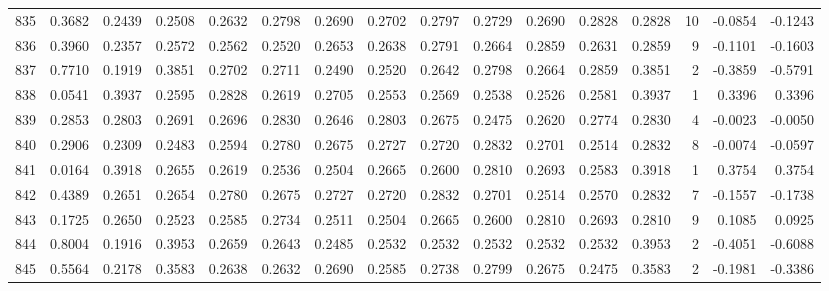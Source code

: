 \begin{tabular}{lrrrrrrrrrrrrrrr}
835 &      0.3682 &  0.2439 &  0.2508 &  0.2632 &  0.2798 &  0.2690 &  0.2702 &  0.2797 &  0.2729 &  0.2690 &   0.2828 &     0.2828 &     10 &                   -0.0854 &                    -0.1243 \\
836 &      0.3960 &  0.2357 &  0.2572 &  0.2562 &  0.2520 &  0.2653 &  0.2638 &  0.2791 &  0.2664 &  0.2859 &   0.2631 &     0.2859 &      9 &                   -0.1101 &                    -0.1603 \\
837 &      0.7710 &  0.1919 &  0.3851 &  0.2702 &  0.2711 &  0.2490 &  0.2520 &  0.2642 &  0.2798 &  0.2664 &   0.2859 &     0.3851 &      2 &                   -0.3859 &                    -0.5791 \\
838 &      0.0541 &  0.3937 &  0.2595 &  0.2828 &  0.2619 &  0.2705 &  0.2553 &  0.2569 &  0.2538 &  0.2526 &   0.2581 &     0.3937 &      1 &                    0.3396 &                     0.3396 \\
839 &      0.2853 &  0.2803 &  0.2691 &  0.2696 &  0.2830 &  0.2646 &  0.2803 &  0.2675 &  0.2475 &  0.2620 &   0.2774 &     0.2830 &      4 &                   -0.0023 &                    -0.0050 \\
840 &      0.2906 &  0.2309 &  0.2483 &  0.2594 &  0.2780 &  0.2675 &  0.2727 &  0.2720 &  0.2832 &  0.2701 &   0.2514 &     0.2832 &      8 &                   -0.0074 &                    -0.0597 \\
841 &      0.0164 &  0.3918 &  0.2655 &  0.2619 &  0.2536 &  0.2504 &  0.2665 &  0.2600 &  0.2810 &  0.2693 &   0.2583 &     0.3918 &      1 &                    0.3754 &                     0.3754 \\
842 &      0.4389 &  0.2651 &  0.2654 &  0.2780 &  0.2675 &  0.2727 &  0.2720 &  0.2832 &  0.2701 &  0.2514 &   0.2570 &     0.2832 &      7 &                   -0.1557 &                    -0.1738 \\
843 &      0.1725 &  0.2650 &  0.2523 &  0.2585 &  0.2734 &  0.2511 &  0.2504 &  0.2665 &  0.2600 &  0.2810 &   0.2693 &     0.2810 &      9 &                    0.1085 &                     0.0925 \\
844 &      0.8004 &  0.1916 &  0.3953 &  0.2659 &  0.2643 &  0.2485 &  0.2532 &  0.2532 &  0.2532 &  0.2532 &   0.2532 &     0.3953 &      2 &                   -0.4051 &                    -0.6088 \\
845 &      0.5564 &  0.2178 &  0.3583 &  0.2638 &  0.2632 &  0.2690 &  0.2585 &  0.2738 &  0.2799 &  0.2675 &   0.2475 &     0.3583 &      2 &                   -0.1981 &                    -0.3386 \\

\end{tabular}
